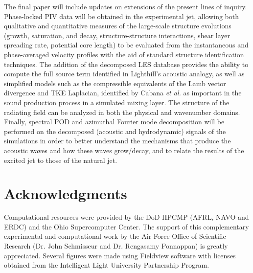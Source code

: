 \documentclass[english]{aiaa-tc}
\begin{document}
The final paper will include updates on extensions of the present lines of
inquiry. Phase-locked PIV data will be 
obtained in the experimental jet, allowing both qualitative and
quantitative measures of the large-scale structure evolutions (growth,
saturation, and decay, structure-structure interactions, shear layer
spreading rate, potential core length) to be evaluated from the
instantaneous and phase-averaged velocity profiles with the aid of
standard structure identification techniques. The addition of the
decomposed LES database provides the ability to compute the full
source term identified in Lighthill's acoustic analogy, as well as
simplified models such as the compressible equivalents of the Lamb
vector divergence and TKE Laplacian, identified by Cabana {\em et
  al.}\cite{Cabana2008} as important in the sound production process
in a simulated mixing layer. The structure of the radiating
field can be analyzed in both the physical and wavenumber
domains. Finally, spectral POD and azimuthal Fourier mode
decomposition will be performed on the decomposed (acoustic and
hydrodynamic) signals of the simulations in order to better understand
the mechanisms that produce the acoustic waves and how these waves
grow/decay, and to relate the results of the excited jet to those of
the natural jet.  


\section*{Acknowledgments}
   Computational resources were provided by the DoD HPCMP (AFRL, NAVO
   and ERDC) and the Ohio Supercomputer Center. The support of this
   complementary experimental and computational work by the Air Force
   Office of Scientific Research (Dr. John Schmisseur and
   Dr. Rengasamy Ponnappan) is greatly appreciated. Several figures
   were made using Fieldview software with licenses obtained from the
   Intelligent Light University Partnership Program. 



\end{document}
